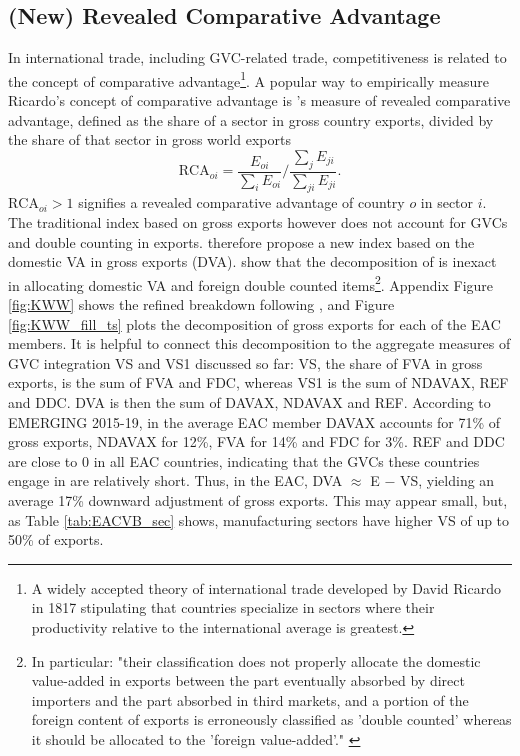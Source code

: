 \documentclass[a4paper]{article}
\begin{document}
\subsection{(New) Revealed Comparative Advantage}

In international trade, including GVC-related trade, competitiveness is related to the concept of comparative advantage\footnote{A widely accepted theory of international trade developed by David Ricardo in 1817 stipulating that countries specialize in sectors where their productivity relative to the international average is greatest.}. 
A popular way to empirically measure Ricardo's concept of comparative advantage is \citet{balassa1965trade}'s measure of revealed comparative advantage, defined as the share of a sector in gross country exports, divided by the share of that sector in gross world exports
\begin{equation}
\text{RCA}_{oi} = \frac{E_{oi}}{\sum_i E_{oi}} \Bigg/ \frac{\sum_j E_{ji}}{\sum_{ji} E_{ji}}.
\end{equation}
$\text{RCA}_{oi}>1$ signifies a revealed comparative advantage of country $o$ in sector $i$. The traditional index based on gross exports however does not account for GVCs and double counting in exports. \citet{koopman2014tracing} therefore propose a new index based on the domestic VA in gross exports (DVA). \citet{borin2019measuring} show that the decomposition of \citet{koopman2014tracing} is inexact in allocating domestic VA and foreign double counted items\footnote{In particular: "their classification does not properly allocate the domestic value-added in exports between the part eventually absorbed by direct importers and the part absorbed in third markets, and  a portion of the foreign content of exports is erroneously classified as 'double counted' whereas it should be allocated to the 'foreign value-added'." \citep{borin2019measuring}}. Appendix Figure \ref{fig:KWW} shows the refined breakdown following \citet{borin2019measuring}, and Figure \ref{fig:KWW_fill_ts} plots the decomposition of gross exports for each of the EAC members. It is helpful to connect this decomposition to the aggregate measures of GVC integration VS and VS1 discussed so far: VS, the share of FVA in gross exports, is the sum of FVA and FDC, whereas VS1 is the sum of NDAVAX, REF and DDC. DVA is then the sum of DAVAX, NDAVAX and REF. According to EMERGING 2015-19, in the average EAC member DAVAX accounts for 71\% of gross exports, NDAVAX for 12\%, FVA for 14\% and FDC for 3\%. REF and DDC are close to 0 in all EAC countries, indicating that the GVCs these countries engage in are relatively short. Thus, in the EAC, DVA $\approx$ E $-$ VS, yielding an average 17\% downward adjustment of gross exports. This may appear small, but, as Table \ref{tab:EACVB_sec} shows, manufacturing sectors have higher VS of up to 50\% of exports. \newline
 
\end{document}
